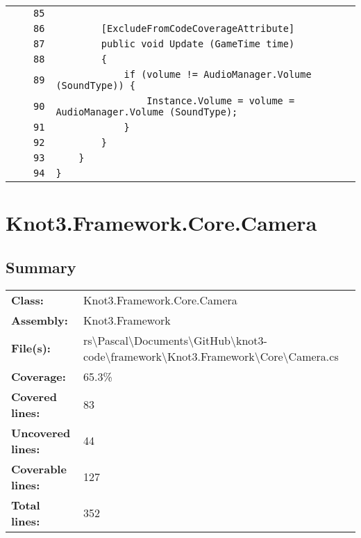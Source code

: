 \documentclass[a4paper,10pt]{article}
\begin{document}
\begin{longtable}[l]{lrrl}
\cellcolor{gray} &  & \verb~85~ & \verb~~\\
\cellcolor{gray} &  & \verb~86~ & \verb~        [ExcludeFromCodeCoverageAttribute]~\\
\cellcolor{gray} &  & \verb~87~ & \verb~        public void Update (GameTime time)~\\
\cellcolor{gray} &  & \verb~88~ & \verb~        {~\\
\cellcolor{gray} &  & \verb~89~ & \verb~            if (volume != AudioManager.Volume (SoundType)) {~\\
\cellcolor{gray} &  & \verb~90~ & \verb~                Instance.Volume = volume = AudioManager.Volume (SoundType);~\\
\cellcolor{gray} &  & \verb~91~ & \verb~            }~\\
\cellcolor{gray} &  & \verb~92~ & \verb~        }~\\
\cellcolor{gray} &  & \verb~93~ & \verb~    }~\\
\cellcolor{gray} &  & \verb~94~ & \verb~}~\\
\end{longtable}
\newpage
\section{Knot3.Framework.Core.Camera}
\subsection{Summary}
\begin{longtable}[l]{ll}
\textbf{Class:} & Knot3.Framework.Core.Camera\\
\textbf{Assembly:} & Knot3.Framework\\
\textbf{File(s):} & \begin{minipage}[t]{12cm}{rs\textbackslash Pascal\textbackslash Documents\textbackslash GitHub\textbackslash knot3-code\textbackslash framework\textbackslash Knot3.Framework\textbackslash Core\textbackslash Camera.cs}\end{minipage} \\
\textbf{Coverage:} & 65.3\%\\
\textbf{Covered lines:} & 83\\
\textbf{Uncovered lines:} & 44\\
\textbf{Coverable lines:} & 127\\
\textbf{Total lines:} & 352\\
\end{longtable}
\end{document}
